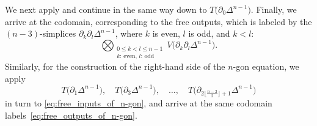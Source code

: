 \documentclass[10pt,a4paper]{amsart}
\numberwithin{equation}{section}
\theoremstyle{definition}
\begin{document}
We next apply  and continue in the same way down to $T\bigl(\partial_0\Delta^{n-1}\bigr)$. Finally, we arrive at the codomain, corresponding to the free outputs, which is labeled by the $(n-3)$-simplices $\partial_k\partial_l\Delta^{n-1}$, where $k$ is even, $l$ is odd, and $k<l$:
\begin{equation}\label{eq:free_outputs_of_n-gon}
 \bigotimes_{\substack{0\leq k<l\leq n-1\\\text{$k$: even, $l$: odd}}} V\bigl(\partial_k\partial_l\Delta^{n-1}\bigr).
\end{equation}
Similarly, for the construction of the right-hand side of the $n$-gon equation, we apply
\[
T\bigl(\partial_1\Delta^{n-1}\bigr),\quad T\bigl(\partial_3\Delta^{n-1}\bigr),\quad \dots,\quad T\bigl(\partial_{2\lfloor\frac{n-2}{2}\rfloor+1}\Delta^{n-1}\bigr)
\]
in turn to \eqref{eq:free_inputs_of_n-gon}, and arrive at the same codomain labels~\eqref{eq:free_outputs_of_n-gon}.
\end{document}
